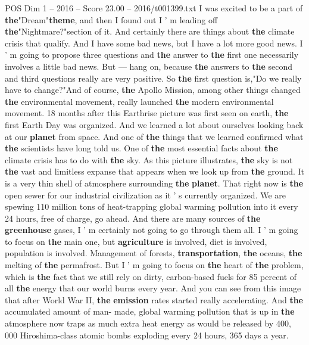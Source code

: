 \begin{textsample}{POS Dim 1 – 2016 – Score 23.00 – 2016/t001399.txt}  \label{ex:f1_pos_051}
I was excited to be a part of \textbf{the}"Dream"\textbf{theme}, and then I found out I ' m leading off \textbf{the}"Nightmare?"section of it.
And certainly there are things about \textbf{the} climate crisis that qualify.
And I have some bad news, but I have a lot more good news.
I ' m going to propose three questions and \textbf{the} answer to \textbf{the} first one necessarily involves a little bad news.
But — hang on, because \textbf{the} answers to \textbf{the} second and third questions really are very positive.
So \textbf{the} first question is,"Do we really have to change?"And of course, \textbf{the} Apollo Mission, among other things changed \textbf{the} environmental movement, really launched \textbf{the} modern environmental movement. 18 months after this Earthrise picture was first seen on earth, \textbf{the} first Earth Day was organized.
And we learned a lot about ourselves looking back at our \textbf{planet} from space.
And one of \textbf{the} things that we learned confirmed what \textbf{the} scientists have long told us.
One of \textbf{the} most essential facts about \textbf{the} climate crisis has to do with \textbf{the} sky.
As this picture illustrates, \textbf{the} sky is not \textbf{the} vast and limitless expanse that appears when we look up from \textbf{the} ground.
It is a very thin shell of atmosphere surrounding \textbf{the} \textbf{planet}.
That right now is \textbf{the} open sewer for our industrial civilization as it ' s currently organized.
We are spewing 110 million tons of heat-trapping global warming pollution into it every 24 hours, free of charge, go ahead.
And there are many sources of \textbf{the} \textbf{greenhouse} gases, I ' m certainly not going to go through them all.
I ' m going to focus on \textbf{the} main one, but \textbf{agriculture} is involved, diet is involved, population is involved.
Management of forests, \textbf{transportation}, \textbf{the} oceans, \textbf{the} melting of \textbf{the} permafrost.
But I ' m going to focus on \textbf{the} heart of \textbf{the} problem, which is \textbf{the} fact that we still rely on dirty, carbon-based fuels for 85 percent of all \textbf{the} energy that our world burns every year.
And you can see from this image that after World War II, \textbf{the} \textbf{emission} rates started really accelerating.
And \textbf{the} accumulated amount of man- made, global warming pollution that is up in \textbf{the} atmosphere now traps as much extra heat energy as would be released by 400, 000 Hiroshima-class atomic bombs exploding every 24 hours, 365 days a year.

\end{textsample}
